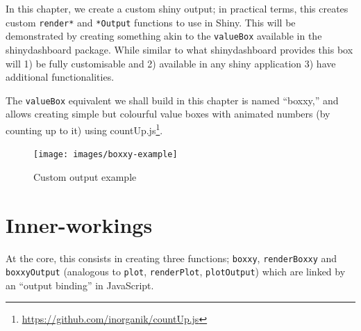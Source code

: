 \documentclass[
  10pt,
]{krantz}
\makeatletter
\newenvironment{Shaded}{\begin{snugshade}}{\end{snugshade}}
\newcommand{\ControlFlowTok}[1]{\textcolor[rgb]{0.27,0.27,0.27}{\textbf{#1}}}
\newcommand{\DecValTok}[1]{\textcolor[rgb]{0.06,0.06,0.06}{#1}}
\newcommand{\KeywordTok}[1]{\textcolor[rgb]{0.27,0.27,0.27}{\textbf{#1}}}
\newcommand{\NormalTok}[1]{#1}
\newcommand{\OperatorTok}[1]{\textcolor[rgb]{0.43,0.43,0.43}{\textbf{#1}}}
\newcommand{\StringTok}[1]{\textcolor[rgb]{0.5,0.5,0.5}{#1}}
\renewcommand{\href}[2]{#2\footnote{\url{#1}}}
\newenvironment{kframe}{%
\medskip{}
\setlength{\fboxsep}{.8em}
 \def\at@end@of@kframe{}%
 \ifinner\ifhmode%
  \def\at@end@of@kframe{\end{minipage}}%
  \begin{minipage}{\columnwidth}%
 \fi\fi%
 \def\FrameCommand##1{\hskip\@totalleftmargin \hskip-\fboxsep
 \colorbox{shadecolor}{##1}\hskip-\fboxsep
     \hskip-\linewidth \hskip-\@totalleftmargin \hskip\columnwidth}%
 \MakeFramed {\advance\hsize-\width
   \@totalleftmargin\z@ \linewidth\hsize
   \@setminipage}}%
 {\par\unskip\endMakeFramed%
 \at@end@of@kframe}
\renewenvironment{Shaded}{\begin{kframe}}{\end{kframe}}
\makeatother
\begin{document}
In this chapter, we create a custom shiny output; in practical terms, this creates custom \texttt{render*} and \texttt{*Output} functions to use in Shiny. This will be demonstrated by creating something akin to the \texttt{valueBox} available in the shinydashboard \citep{R-shinydashboard} package. While similar to what shinydashboard provides this box will 1) be fully customisable and 2) available in any shiny application 3) have additional functionalities.

The \texttt{valueBox} equivalent we shall build in this chapter is named ``boxxy,'' and allows creating simple but colourful value boxes with animated numbers (by counting up to it) using \href{https://github.com/inorganik/countUp.js}{countUp.js}.

\begin{Shaded}
\end{Shaded}

\begin{figure}[H]

{\centering \texttt{[image: images/boxxy-example]} 

}

\caption{Custom output example}\label{fig:boxxy-example}
\end{figure}

\hypertarget{shiny-output-inner-workings}{%
\section{Inner-workings}\label{shiny-output-inner-workings}}

At the core, this consists in creating three functions; \texttt{boxxy}, \texttt{renderBoxxy} and \texttt{boxxyOutput} (analogous to \texttt{plot}, \texttt{renderPlot}, \texttt{plotOutput}) which are linked by an ``output binding'' in JavaScript.
\end{document}
